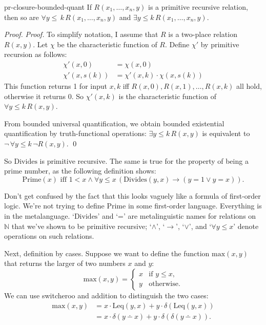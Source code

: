 \begin{proposition}{}{pr-closure-bounded-quant}
  If $R(x_1, \ldots, x_n, y)$ is a primitive recursive relation,
  then so are ${\forall y \!\leq\!\, k}\, R(x_1, \ldots, x_n, y)$ and ${\exists y \!\leq\! k}\, R(x_1, \ldots, x_n, y)$.
\end{proposition}
\begin{proof}
  \emph{Proof.}
  To simplify notation,
  I assume that $R$ is a two-place relation $R(x,y)$.
  Let $\chi$ be the characteristic function of $R$.
  Define $\chi'$ by primitive recursion as follows:
  \begin{align*}
    \chi'(x,0) &= \chi(x,0)\\
    \chi'(x,s(k)) &= \chi'(x,k) \cdot \chi(x,s(k))
  \end{align*}
  This function returns 1 for input $x,k$ iff $R(x,0), R(x,1), \ldots, R(x,k)$ all hold,
  otherwise it returns 0.
  So $\chi'(x,k)$ is the characteristic function of $\forall y \!\leq\! k\, R(x,y)$.

  From bounded universal quantification, we obtain bounded existential quantification by truth-functional operations:
  $\exists y \!\leq\! k\, R(x,y)$ is equivalent to $\neg \,\forall y \!\leq\! k\, \neg R(x,y)$.
  \qed
\end{proof}

So $\mathrm{Divides}$ is primitive recursive.
The same is true for the property of being a prime number,
as the following definition shows:
\[
  \mathrm{Prime}(x) \text{ iff } 1 < x \land \forall y \!\leq\! x \,(\mathrm{Divides}(y,x) \to (y = 1 \lor y = x)).
\]

Don't get confused by the fact that
this looks vaguely like
a formula of first-order logic.
We're not trying to define $\mathrm{Prime}$ in some first-order language.
Everything is in the metalanguage.
`$\mathrm{Divides}$' and `=' are metalinguistic names for relations on $\mathbb{N}$
that we've shown to be primitive recursive;
`$\land$', `$\to$', `$\lor$', and `$\forall y \leq x$' denote operations on such relations.

Next, definition by cases.
Suppose we want to define
the function $\mathrm{max}(x,y)$
that returns the larger of two numbers $x$ and $y$:
\[
  \mathrm{max}(x,y) =
  \begin{cases}
    x & \text{if } y \leq x,\\
    y & \text{otherwise.}
  \end{cases}
\]
We can use switcheroo and addition to distinguish the two cases:
\begin{align*}
  \mathrm{max}(x,y) &= x \cdot \mathrm{Leq}(y,x) + y \cdot \delta(\mathrm{Leq}(y,x))\\
                    &= x \cdot \delta(y\dotminus x) + y \cdot \delta(\delta(y\dotminus x)).
\end{align*}

